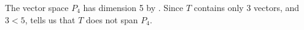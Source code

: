 The vector space $P_4$ has dimension 5 by .  Since $T$ contains only 3 vectors, and $3<5$,  tells us that $T$ does not span $P_4$.
